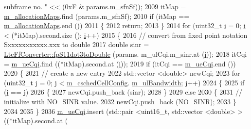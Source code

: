 \begin{DoxyCode}
{       subframe no. "} << (0xF & params.m\_sfnSf));
2009         itMap = \hyperlink{classns3_1_1PfFfMacScheduler_a372b18540784762ebc10292caf8ca40f}{m\_allocationMaps}.find (params.m\_sfnSf);
2010         \textcolor{keywordflow}{if} (itMap == \hyperlink{classns3_1_1PfFfMacScheduler_a372b18540784762ebc10292caf8ca40f}{m\_allocationMaps}.end ())
2011           \{
2012             \textcolor{keywordflow}{return};
2013           \}
2014         \textcolor{keywordflow}{for} (uint32\_t \hyperlink{bernuolliDistribution_8m_a6f6ccfcf58b31cb6412107d9d5281426}{i} = 0; \hyperlink{bernuolliDistribution_8m_a6f6ccfcf58b31cb6412107d9d5281426}{i} < (*itMap).second.size (); \hyperlink{bernuolliDistribution_8m_a6f6ccfcf58b31cb6412107d9d5281426}{i}++)
2015           \{
2016             \textcolor{comment}{// convert from fixed point notation Sxxxxxxxxxxx.xxx to double}
2017             \textcolor{keywordtype}{double} sinr = \hyperlink{classns3_1_1LteFfConverter_aa5d8c2a8f988dbd63da91818c18666eb}{LteFfConverter::fpS11dot3toDouble} (params.
      m\_ulCqi.m\_sinr.at (\hyperlink{bernuolliDistribution_8m_a6f6ccfcf58b31cb6412107d9d5281426}{i}));
2018             itCqi = \hyperlink{classns3_1_1PfFfMacScheduler_acf67c0074356c705e8bd89bb49ddd5ad}{m\_ueCqi}.find ((*itMap).second.at (\hyperlink{bernuolliDistribution_8m_a6f6ccfcf58b31cb6412107d9d5281426}{i}));
2019             \textcolor{keywordflow}{if} (itCqi == \hyperlink{classns3_1_1PfFfMacScheduler_acf67c0074356c705e8bd89bb49ddd5ad}{m\_ueCqi}.end ())
2020               \{
2021                 \textcolor{comment}{// create a new entry}
2022                 std::vector <double> newCqi;
2023                 \textcolor{keywordflow}{for} (uint32\_t j = 0; j < \hyperlink{classns3_1_1PfFfMacScheduler_a0be1f7a1e78824b031e48208b8af1048}{m\_cschedCellConfig}.
      \hyperlink{structns3_1_1FfMacCschedSapProvider_1_1CschedCellConfigReqParameters_a5ab5b102878e6e7e7727a14af4a64d2f}{m\_ulBandwidth}; j++)
2024                   \{
2025                     \textcolor{keywordflow}{if} (\hyperlink{bernuolliDistribution_8m_a6f6ccfcf58b31cb6412107d9d5281426}{i} == j)
2026                       \{
2027                         newCqi.push\_back (sinr);
2028                       \}
2029                     \textcolor{keywordflow}{else}
2030                       \{
2031                         \textcolor{comment}{// initialize with NO\_SINR value.}
2032                         newCqi.push\_back (\hyperlink{cqa-ff-mac-scheduler_8h_a520d71777be043568160c783a9c65fd5}{NO\_SINR});
2033                       \}
2034 
2035                   \}
2036                 \hyperlink{classns3_1_1PfFfMacScheduler_acf67c0074356c705e8bd89bb49ddd5ad}{m\_ueCqi}.insert (std::pair <uint16\_t, std::vector <double> > ((*itMap).second.at (

\end{DoxyCode}
